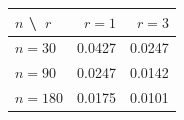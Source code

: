 \begin{tabular}{lrr}
\toprule
$n$ \textbackslash\ $r$ & $r{=}1$ & $r{=}3$\\
\midrule
$n{=}30$ & 0.0427 & 0.0247\\
$n{=}90$ & 0.0247 & 0.0142\\
$n{=}180$ & 0.0175 & 0.0101\\
\bottomrule
\end{tabular}
